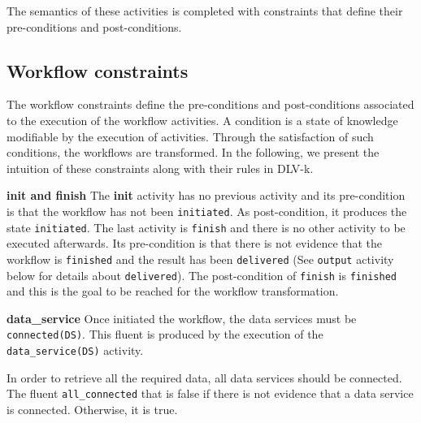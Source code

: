 
				   
The semantics of these activities is completed with constraints that define their pre-conditions and post-conditions.
				
\subsection{Workflow constraints} 
The workflow constraints define the pre-conditions and post-conditions associated to the execution of the workflow activities. A condition is a state of knowledge modifiable by the execution of activities. Through the satisfaction of such conditions, the workflows are transformed.
In the following, we present the intuition of these constraints along with their rules in DLV-k.

               
\textbf{init and finish} The \textbf{init} activity has no previous activity and its pre-condition is that the workflow has not been \texttt{initiated}. As post-condition, it produces the state \texttt{initiated}. The last activity is \texttt{finish} and there is no other activity to be executed afterwards. Its pre-condition is that there is not evidence that the workflow is \texttt{finished} and the result has been \texttt{delivered} (See \texttt{output} activity below for details about \texttt{delivered}). The post-condition of \texttt{finish} is \texttt{finished} and this is the goal to be reached for the workflow transformation.
                            
%


                   
\textbf{data\_service} Once initiated the workflow, the data services must be \texttt{connected(DS)}. This fluent is produced by the execution of the \texttt{data\_service(DS)} activity. 

%



In order to retrieve all the required data, all data services should be connected. The fluent \texttt{all_connected} that is false if there is not evidence that a data service is connected. Otherwise, it is true.

